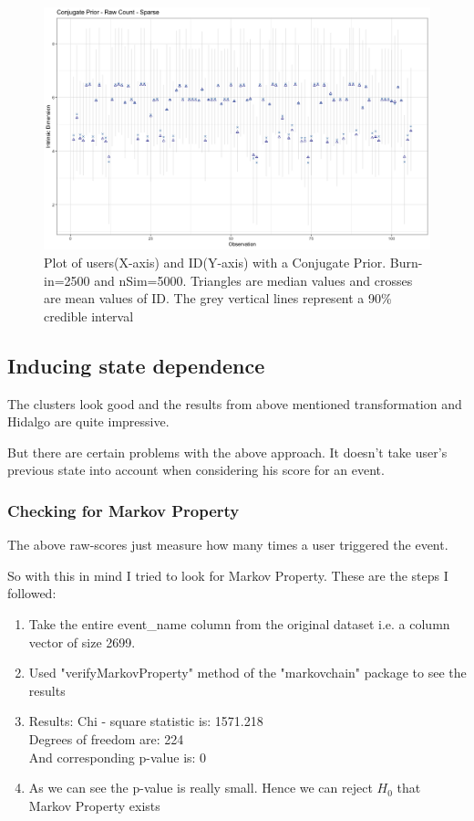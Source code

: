 \documentclass{article}
\begin{document}
\begin{figure}[H]
  \includegraphics[width=1.3\textwidth]{RawCount-ConjugatePrior-Sparse.png}
  \caption{Plot of users(X-axis) and ID(Y-axis) with a Conjugate Prior. Burn-in=2500 and nSim=5000. Triangles are median values and crosses are mean values of ID. The grey vertical lines represent a 90\% credible interval}
\label{fig}
\end{figure}

\subsection{Inducing state dependence}
The clusters look good and the results from above mentioned transformation and Hidalgo are quite impressive.

But there are certain problems with the above approach.
It doesn't take user's previous state into account when considering his score for an event.

\subsubsection{Checking for Markov Property}
The above raw-scores just measure how many times a user triggered the event. 

So with this in mind I tried to look for Markov Property.
These are the steps I followed:
\begin{enumerate}
    \item Take the entire event\_name column from the original dataset i.e. a column vector of size 2699.
    \item Used "verifyMarkovProperty" method of the "markovchain" package to see the results
    \item Results: 
    Chi - square statistic is: 1571.218 \\
    Degrees of freedom are: 224 \\
    And corresponding p-value is: 0 
    \item As we can see the p-value is really small. Hence we can reject ${H_0}$ that Markov Property exists
\end{enumerate}
\end{document}
